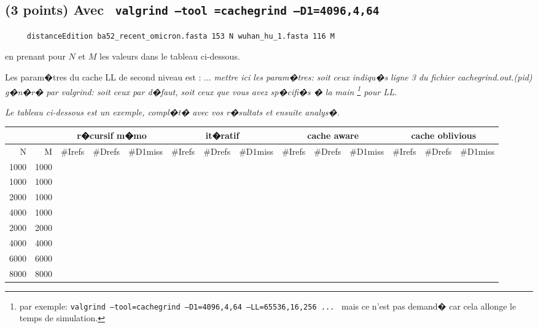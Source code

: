 \documentclass[10pt,a4paper]{article}
\begin{document}
\subsection{(3 points) Avec {\tt 
	valgrind --tool =cachegrind --D1=4096,4,64
}} 
\begin{verbatim}
     distanceEdition ba52_recent_omicron.fasta 153 N wuhan_hu_1.fasta 116 M 
\end{verbatim}
en prenant pour $N$ et $M$ les valeurs dans le tableau ci-dessous.


Les param�tres du cache LL de second niveau est : ...
{\em mettre ici les param�tres: soit ceux indiqu�s ligne 3
du fichier cachegrind.out.(pid) g�n�r� par valgrind: soit ceux par d�faut,
soit ceux que vous avez sp�cifi�s � la main
\footnote{par exemple:
{\tt valgrind --tool=cachegrind --D1=4096,4,64 --LL=65536,16,256  ... }
mais ce n'est pas demand� car cela allonge le temps de simulation. } 
 pour LL. }

{\em Le tableau ci-dessous est un exemple,  compl�t� avec vos r�sultats et 
ensuite analys�.}
\\
{\footnotesize
\begin{tabular}{|r|r||r|r|r||r|r|r||r|r|r||r|r|r||}
\hline
 \multicolumn{2}{|c||}{ } 
& \multicolumn{3}{c||}{r�cursif m�mo}
& \multicolumn{3}{c||}{it�ratif}
& \multicolumn{3}{c||}{cache aware}
& \multicolumn{3}{c||}{cache oblivious}
\\ \hline
N & M 
& \#Irefs & \#Drefs & \#D1miss %
& \#Irefs & \#Drefs & \#D1miss %
& \#Irefs & \#Drefs & \#D1miss %
& \#Irefs & \#Drefs & \#D1miss %
\\ \hline
\hline
1000 & 1000 
&  &  &   %
&  &  &   %
&  &  &   %
&  &  &   %
\\ \hline
1000 & 1000 
&  &  &   %
&  &  &   %
&  &  &   %
&  &  &   %
\\ \hline
2000 & 1000 
&  &  &   %
&  &  &   %
&  &  &   %
&  &  &   %
\\ \hline
4000 & 1000 
&  &  &   %
&  &  &   %
&  &  &   %
&  &  &   %
\\ \hline
2000 & 2000 
&  &  &   %
&  &  &   %
&  &  &   %
&  &  &   %
\\ \hline
4000 & 4000 
&  &  &   %
&  &  &   %
&  &  &   %
&  &  &   %
\\ \hline
6000 & 6000 
&  &  &   %
&  &  &   %
&  &  &   %
&  &  &   %
\\ \hline
8000 & 8000 
&  &  &   %
&  &  &   %
&  &  &   %
&  &  &   %
\\ \hline
\hline
\end{tabular}
}
\end{document}
